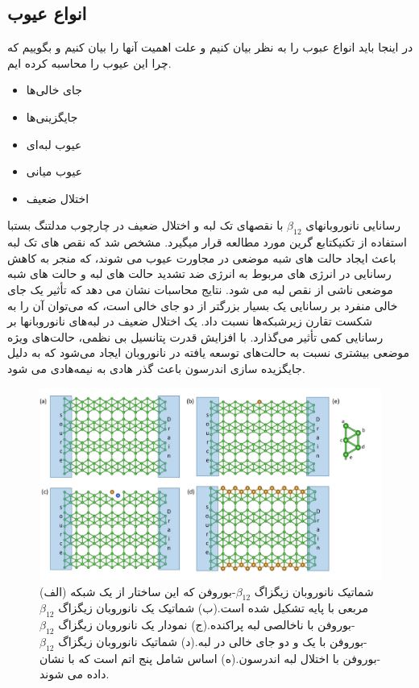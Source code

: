 \subsection{انواع عیوب}
در اینجا باید انواع عبوب را به نظر بیان کنیم و علت اهمیت آنها را بیان کنیم و بگوییم که چرا این عیوب را محاسبه کرده ایم.
\begin{itemize}
  \item جای خالی‌ها
  \item جایگزینی‌ها
  \item عیوب لبه‌ای
  \item عیوب میانی
  \item اختلال ضعیف
\end{itemize}
رسانایی نانوروبانهای $\beta_{12}$  با نقصهای تک لبه و اختلال ضعیف در چارچوب مدل\gls{تنگ بست}با استفاده از تکنیک\gls{تابع گرین} مورد مطالعه قرار میگیرد. مشخص شد که نقص های تک لبه باعث ایجاد حالت های شبه موضعی در مجاورت عیوب می شوند، که منجر به کاهش رسانایی در انرژی های مربوط به انرژی ضد تشدید حالت های لبه و حالت های شبه موضعی ناشی از نقص لبه می شود. نتایج محاسبات نشان می دهد که تأثیر یک جای خالی منفرد بر رسانایی یک  بسیار بزرگتر از دو جای خالی است، که می‌توان آن را به شکست تقارن زیرشبکه‌ها نسبت داد. یک اختلال ضعیف در لبه‌های نانوروبانها بر رسانایی کمی تأثیر می‌گذارد. با افزایش قدرت پتانسیل بی نظمی، حالت‌های ویژه موضعی بیشتری نسبت به حالت‌های توسعه یافته در نانوروبان ایجاد می‌شود که به دلیل جایگزیده سازی اندرسون باعث گذر هادی به نیمه‌هادی می شود.
\begin{figure}[!ht]
  \centering
    \includegraphics[width=1\linewidth]{./figures/borophene_structure(3).JPG}
    \caption{(الف) شماتیک نانوروبان زیگزاگ $\beta_{12}$-بوروفن که این ساختار از یک شبکه مربعی با پایه تشکیل شده است.(ب) شماتیک یک نانوروبان زیگزاگ $\beta_{12}$-بوروفن با ناخالصی لبه پراکنده.(ج) نمودار یک نانوروبان زیگزاگ $\beta_{12}$-بوروفن با یک و دو جای خالی در لبه.(د) شماتیک نانوروبان زیگزاگ $\beta_{12}$-بوروفن با اختلال لبه اندرسون.(ه) اساس شامل پنج اتم است که با  نشان داده می شوند.}
   \label{fig:borophene}
\end{figure}
